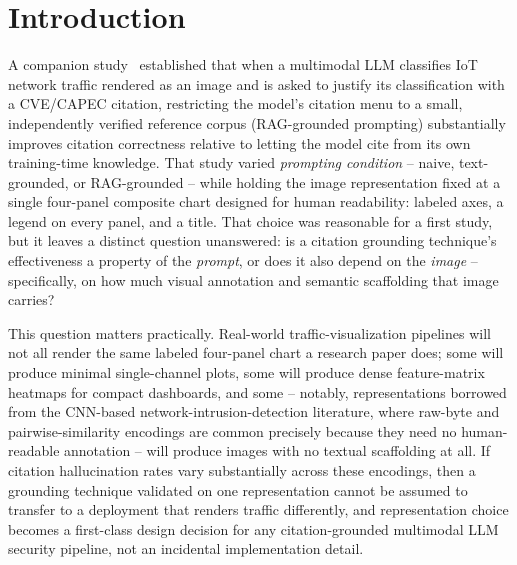 \documentclass[twocolumn]{svjour3}
\begin{document}
\begin{abstract}
representations (recurrence\_plot, grayscale\_matrix, rgb\_stack) collapse to chance-level accuracy
($\approx$10\%, matching the 10-class base rate) for both models. Critically, this collapse is not a
retreat into honest uncertainty: both models continue to volunteer confident citations at low
unannotated-representation no-citation rates (0--16\%), and Qwen-vl-plus's collapse is total --
identical classification and citation output on literally every one of the 3,060 unannotated-image
calls, regardless of the true class. This is evidence for hallucination-through-fabrication (a
variant of H1) rather than hallucination-through-elaboration (H2): stripping annotation does not make
either model behave more conservatively, it makes both models guess with undiminished confidence.

\end{abstract}

\section{Introduction}

A companion study~\cite{groundingcitation2026} established that when a multimodal LLM classifies
IoT network traffic rendered as an image and is asked to justify its classification with a
CVE/CAPEC citation, restricting the model's citation menu to a small, independently verified
reference corpus (RAG-grounded prompting) substantially improves citation correctness relative to
letting the model cite from its own training-time knowledge. That study varied \emph{prompting
condition} -- naive, text-grounded, or RAG-grounded -- while holding the image representation fixed
at a single four-panel composite chart designed for human readability: labeled axes, a legend on
every panel, and a title. That choice was reasonable for a first study, but it leaves a distinct
question unanswered: is a citation grounding technique's effectiveness a property of the
\emph{prompt}, or does it also depend on the \emph{image} -- specifically, on how much visual
annotation and semantic scaffolding that image carries?

This question matters practically. Real-world traffic-visualization pipelines will not all render
the same labeled four-panel chart a research paper does; some will produce minimal single-channel
plots, some will produce dense feature-matrix heatmaps for compact dashboards, and some -- notably,
representations borrowed from the CNN-based network-intrusion-detection literature, where
raw-byte and pairwise-similarity encodings are common precisely because they need no human-readable
annotation -- will produce images with no textual scaffolding at all. If citation hallucination
rates vary substantially across these encodings, then a grounding technique validated on one
representation cannot be assumed to transfer to a deployment that renders traffic differently, and
representation choice becomes a first-class design decision for any citation-grounded multimodal
LLM security pipeline, not an incidental implementation detail.
\end{document}
